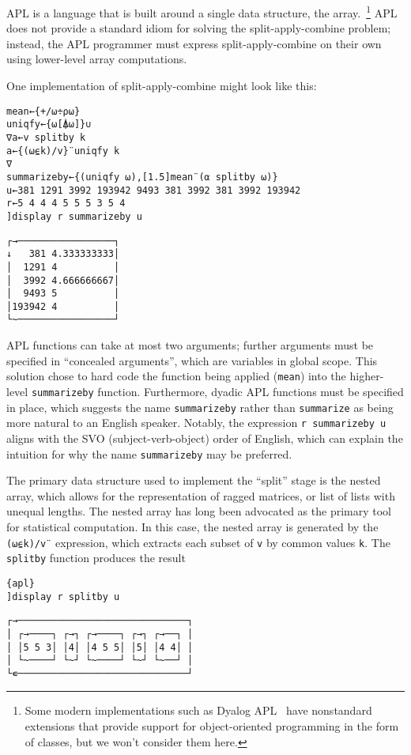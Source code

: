 \documentclass[11pt]{asaproc}
\begin{document}
APL is a language that is built around a single data structure, the
array.~\footnote{Some modern implementations such as Dyalog APL~\cite{dyalog15}
have nonstandard extensions that provide support for object-oriented
programming in the form of classes, but we won't consider them here.} APL does
not provide a standard idiom for solving the split-apply-combine problem;
instead, the APL programmer must express split-apply-combine on their own using
lower-level array computations.

One implementation of split-apply-combine might look like this:

\begin{lstlisting}[language=apl]
mean←{+/⍵÷⍴⍵}
uniqfy←{⍵[⍋⍵]}∪
∇a←v splitby k
a←{(⍵⍷k)/v}¨uniqfy k
∇
summarizeby←{(uniqfy ⍵),[1.5]mean¨(⍺ splitby ⍵)}
u←381 1291 3992 193942 9493 381 3992 381 3992 193942
r←5 4 4 4 5 5 5 3 5 4
]display r summarizeby u
\end{lstlisting}
\begin{verbatim}
┌→─────────────────┐
↓   381 4.333333333│
│  1291 4          │
│  3992 4.666666667│
│  9493 5          │
│193942 4          │
└~─────────────────┘
\end{verbatim}

APL functions can take at most two arguments; further arguments must be
specified in ``concealed arguments'', which are variables in global scope.
This solution chose to hard code the function being applied (\lstinline|mean|)
into the higher-level \lstinline|summarizeby| function. Furthermore, dyadic APL
functions must be specified in place, which suggests the name
\lstinline|summarizeby| rather than \lstinline|summarize| as being more natural
to an English speaker. Notably, the expression \lstinline|r summarizeby u|
aligns with the SVO (subject-verb-object) order of English, which can explain
the intuition for why the name \lstinline|summarizeby| may be preferred.

The primary data structure used to implement the ``split'' stage is the nested
array, which allows for the representation of ragged matrices, or list of lists
with unequal lengths. The nested array has long been advocated as the primary
tool for statistical computation\cite{Anscombe1981,Friendly1994}. In this case,
the nested array is generated by the \lstinline|(⍵⍷k)/v¨| expression, which
extracts each subset of \lstinline|v| by common values \lstinline|k|. The
\lstinline|splitby| function produces the result

\begin{lstlisting}{apl}
]display r splitby u
\end{lstlisting}
\begin{verbatim}
┌→──────────────────────────────┐
│ ┌→────┐ ┌→┐ ┌→────┐ ┌→┐ ┌→──┐ │
│ │5 5 3│ │4│ │4 5 5│ │5│ │4 4│ │
│ └~────┘ └~┘ └~────┘ └~┘ └~──┘ │
└∊──────────────────────────────┘
\end{verbatim}
\end{document}
